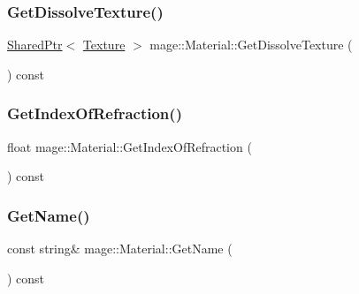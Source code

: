 \hypertarget{structmage_1_1_material_abcf6fa7acad8c0cda8859e32eb2c3168}{}\label{structmage_1_1_material_abcf6fa7acad8c0cda8859e32eb2c3168} 
\subsubsection{\texorpdfstring{Get\+Dissolve\+Texture()}{GetDissolveTexture()}}
{\footnotesize\ttfamily \hyperlink{namespacemage_a1e01ae66713838a7a67d30e44c67703e}{Shared\+Ptr}$<$ \hyperlink{classmage_1_1_texture}{Texture} $>$ mage\+::\+Material\+::\+Get\+Dissolve\+Texture (\begin{DoxyParamCaption}{ }\end{DoxyParamCaption}) const\hspace{0.3cm}{\ttfamily [noexcept]}}

\hypertarget{structmage_1_1_material_afa719020dabd412bbb06ac9f0d85abe9}{}\label{structmage_1_1_material_afa719020dabd412bbb06ac9f0d85abe9} 
\subsubsection{\texorpdfstring{Get\+Index\+Of\+Refraction()}{GetIndexOfRefraction()}}
{\footnotesize\ttfamily float mage\+::\+Material\+::\+Get\+Index\+Of\+Refraction (\begin{DoxyParamCaption}{ }\end{DoxyParamCaption}) const\hspace{0.3cm}{\ttfamily [noexcept]}}

\hypertarget{structmage_1_1_material_a9edb2f437eca07c6c12c24d10ec30eb3}{}\label{structmage_1_1_material_a9edb2f437eca07c6c12c24d10ec30eb3} 
\subsubsection{\texorpdfstring{Get\+Name()}{GetName()}}
{\footnotesize\ttfamily const string\& mage\+::\+Material\+::\+Get\+Name (\begin{DoxyParamCaption}{ }\end{DoxyParamCaption}) const\hspace{0.3cm}{\ttfamily [noexcept]}}

